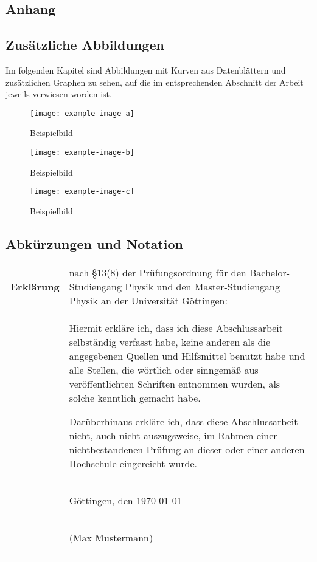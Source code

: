 
\begin{appendix}
\printbibliography
\chapter{Anhang}
 \section{Zusätzliche Abbildungen}
 Im folgenden Kapitel sind Abbildungen mit Kurven aus Datenblättern und
 zusätzlichen Graphen zu sehen, auf die im entsprechenden Abschnitt der Arbeit
 jeweils verwiesen worden ist.

\begin{figure}
  \texttt{[image: example-image-a]}
  \caption{Beispielbild}
\end{figure}

\begin{figure}
  \texttt{[image: example-image-b]}
  \caption{Beispielbild}
\end{figure}

\begin{figure}
  \texttt{[image: example-image-c]}
  \caption{Beispielbild}
\end{figure}

 \FloatBarrier
 \newpage
\section{Abkürzungen und Notation}
\printglossary[type=\acronymtype,title=Abkürzungen]
\printglossary[title=Notation]



\end{appendix}

  \cleardoublepage\thispagestyle{empty}
  \null\vfill
  \noindent
  \begin{tabular}[t]{p{}p{}}
    \bfseries\large Erkl\"arung&nach
    \S13(8)%
    der Prüfungsordnung für den
    Bachelor-Studiengang Physik und den Master-Studiengang Physik
    an der Universität Göttingen:\\[1em]
    &Hiermit erkläre ich, dass ich diese Abschlussarbeit
    selbständig verfasst habe, keine anderen als die
    angegebenen Quellen und Hilfsmittel benutzt habe und alle Stellen,
    die wörtlich oder sinngemä\ss{} aus veröffentlichten Schriften
    entnommen wurden, als solche kenntlich gemacht habe.

    Darüberhinaus erkläre ich, dass diese Abschlussarbeit nicht, auch nicht
    auszugsweise, im Rahmen einer nichtbestandenen Prüfung an dieser oder
    einer anderen Hochschule eingereicht wurde.\\[1em]
    &\begin{center}Göttingen, den \today \end{center}\\[1.5cm]
    &\begin{center}(Max Mustermann)\end{center}
  \end{tabular}
  \vfill
